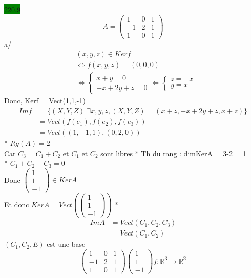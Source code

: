 \documentclass{article}
\begin{document}
\noindent \colorbox{green}{220.9}
\begin{equation*}
    A = \begin{pmatrix}
        1&0&1\\-1&2&1\\1&0&1
    \end{pmatrix}
\end{equation*}
a/ \begin{align*}
    &(x,y,z) \in Kerf\\
    &\Leftrightarrow f(x,y,z) = (0,0,0)\\
    &\Leftrightarrow \begin{cases}
        x+y=0\\
        -x+2y+z = 0
    \end{cases}
    \Leftrightarrow \begin{cases}
        z = -x\\
        y = x
    \end{cases}
\end{align*}
Donc, Kerf = Vect(1,1,-1)\\
\begin{align*}
    Imf &= \{(X,Y,Z) | \exists x,y,z, (X,Y,Z) = (x+z,-x+2y+z, x+z)\}\\
    &= Vect(f(e_1), f(e_2), f(e_3))\\
    &= Vect((1,-1,1), (0,2,0))
\end{align*}
* \(Rg(A) = 2\)\\
Car \(C_3 = C_1 + C_2\) et \(C_1\) et \(C_2\) sont libres
* Th du rang : dimKerA = 3-2 = 1\\
* \(C_1 + C_2 - C_3 = 0\)\\
Donc \(\begin{pmatrix}
    1\\1\\-1
\end{pmatrix} \in KerA\)\\
Et donc \(KerA = Vect(\begin{pmatrix}
    1\\1\\-1
\end{pmatrix})\)
* \begin{align*}
    ImA &= Vect(C_1, C_2,C_3)\\
    &= Vect(C_1, C_2)
\end{align*}
\((C_1,C_2,E)\) est une base\\
\begin{equation*}
    \begin{pmatrix}
        1&0&1\\-1&2&1\\1&0&1
    \end{pmatrix}\begin{pmatrix}
        1\\1\\-1
    \end{pmatrix} f:\mathbb{R}^3\to \mathbb{R^3}
\end{equation*}
\end{document}
